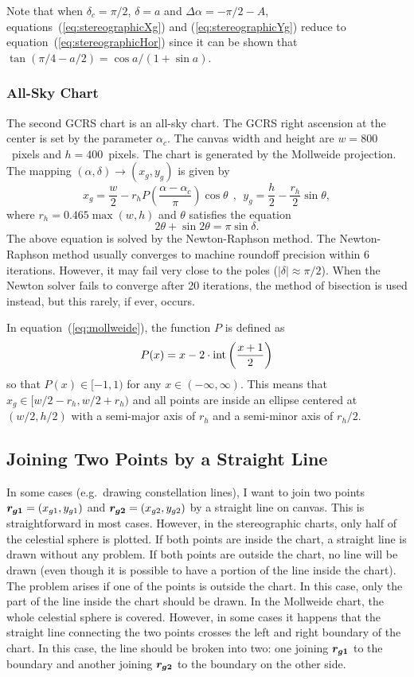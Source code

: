 \documentclass[12pt]{article}
\newcommand \beq {\begin{equation}}
\newcommand \eeq {\end{equation}}
\newcommand{\ve}[1]{\mbox{\boldmath $#1$}}
\begin{document}
Note that when $\delta_c=\pi/2$, $\delta = a$ and $\Delta \alpha = -\pi/2 - A$, 
equations~(\ref{eq:stereographicXg}) and (\ref{eq:stereographicYg}) reduce 
to equation~(\ref{eq:stereographicHor}) since it can be shown that 
$\tan(\pi/4 - a/2) = \cos a/(1+\sin a)$.

\subsubsection{All-Sky Chart} 

The second GCRS chart is an all-sky chart. The GCRS right ascension at the center 
is set by the parameter $\alpha_c$. The canvas width and height are $w=800$~pixels 
and $h=400$~pixels. The chart is generated by the Mollweide 
projection. The mapping $(\alpha, \delta) \rightarrow (x_g,y_g)$ is given by 
\beq
  x_g = \frac{w}{2} - r_h P\left( \frac{\alpha-\alpha_c}{\pi}\right) \cos \theta 
\ \ , \ \ y_g = \frac{h}{2} - \frac{r_h}{2} \sin \theta , 
\label{eq:mollweide}
\eeq
where $r_h = 0.465\max(w,h)$ and $\theta$ satisfies the equation 
\beq
  2\theta + \sin 2\theta = \pi \sin \delta .
\eeq 
The above equation is solved by the Newton-Raphson method. The Newton-Raphson 
method usually converges to machine roundoff precision within 6 iterations. 
However, it may fail very close to the poles ($|\delta|\approx \pi/2$). 
When the Newton solver fails to converge after 20 iterations, the method 
of bisection is used instead, but this rarely, if ever, occurs.

In equation~(\ref{eq:mollweide}), the function $P$ is defined as 
\beq
  P(x) = x - 2 \cdot {\rm int}\left( \frac{x+1}{2} \right) 
\eeq
so that $P(x) \in [-1,1)$ for any $x\in (-\infty, \infty)$.
This means that $x_g \in [w/2 - r_h, w/2 + r_h)$ and all points are inside 
an ellipse centered at $(w/2,h/2)$ with a semi-major axis of $r_h$ and 
a semi-minor axis of $r_h/2$.

\subsection{Joining Two Points by a Straight Line}

In some cases (e.g.\ drawing constellation lines), I want to join 
two points $\ve{r_{g1}}=(x_{g1},y_{g1})$ 
and $\ve{r_{g2}}=(x_{g2},y_{g2})$ by a straight line on canvas. 
This is straightforward in most cases. However, 
in the stereographic charts, only half of the celestial sphere is plotted. 
If both points are inside the chart, a straight line is drawn without any 
problem. If both points are outside the chart, no line will be drawn (even 
though it is possible to have a portion of the line inside the chart). 
The problem arises if one of the points is outside the chart. In this case, 
only the part of the line inside the chart should be drawn. In the Mollweide 
chart, the whole celestial sphere is covered. However, in some cases it happens 
that the straight line connecting the two points crosses the left and right 
boundary of the chart. In this case, the line should be broken into two: one 
joining $\ve{r_{g1}}$ to the boundary and another joining $\ve{r_{g2}}$ to the 
boundary on the other side. 
\end{document}
